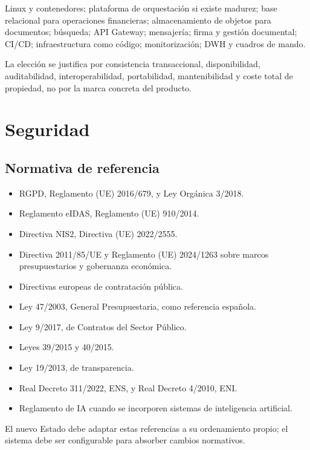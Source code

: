 \documentclass[11pt,a4paper]{article}
\begin{document}
Linux y contenedores; plataforma de orquestación si existe madurez; base relacional para operaciones financieras; almacenamiento de objetos para documentos; búsqueda; API Gateway; mensajería; firma y gestión documental; CI/CD; infraestructura como código; monitorización; DWH y cuadros de mando.

La elección se justifica por consistencia transaccional, disponibilidad, auditabilidad, interoperabilidad, portabilidad, mantenibilidad y coste total de propiedad, no por la marca concreta del producto.

\section{Seguridad}

\subsection{Normativa de referencia}
\begin{itemize}
\item RGPD, Reglamento (UE) 2016/679, y Ley Orgánica 3/2018.
\item Reglamento eIDAS, Reglamento (UE) 910/2014.
\item Directiva NIS2, Directiva (UE) 2022/2555.
\item Directiva 2011/85/UE y Reglamento (UE) 2024/1263 sobre marcos presupuestarios y gobernanza económica.
\item Directivas europeas de contratación pública.
\item Ley 47/2003, General Presupuestaria, como referencia española.
\item Ley 9/2017, de Contratos del Sector Público.
\item Leyes 39/2015 y 40/2015.
\item Ley 19/2013, de transparencia.
\item Real Decreto 311/2022, ENS, y Real Decreto 4/2010, ENI.
\item Reglamento de IA cuando se incorporen sistemas de inteligencia artificial.
\end{itemize}

El nuevo Estado debe adaptar estas referencias a su ordenamiento propio; el sistema debe ser configurable para absorber cambios normativos.
\end{document}

